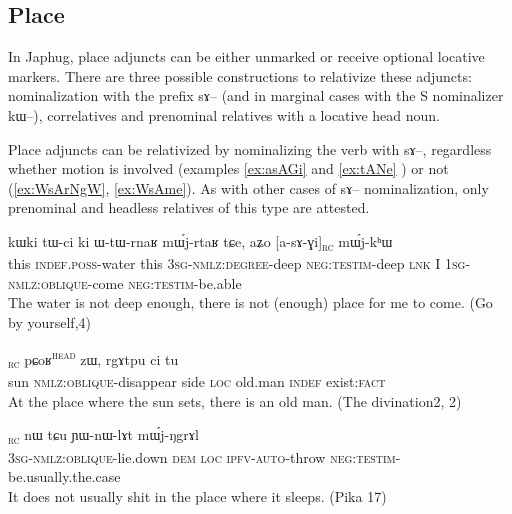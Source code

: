 \documentclass[oldfontcommands,oneside,a4paper,11pt]{article}
\newcommand{\ipa}[1]{{\phon #1}} %
\newcommand{\tete}{\textsuperscript{\textsc{head}}}
\newcommand{\rc}{\textsubscript{\textsc{rc}}}
\begin{document}
 



\subsection{Place} \label{sec:rel:place}
In Japhug, place adjuncts can be either unmarked or receive optional locative markers. %
There are three possible constructions to relativize these adjuncts: nominalization with the prefix \ipa{sɤ}-- (and in marginal cases with the S nominalizer \ipa{kɯ--}), correlatives and prenominal relatives with a locative head noun.

Place adjuncts can be relativized by nominalizing the verb with \ipa{sɤ}--, regardless whether motion is involved (examples \ref{ex:asAGi} and \ref{ex:tANe} )  or not (\ref{ex:WsArNgW}, \ref{ex:WsAme}). As with other cases of \ipa{sɤ}-- nominalization, only prenominal and headless relatives of this type are attested.

\begin{exe}
   \ex \label{ex:asAGi}
 \gll
\ipa{kɯki}   	\ipa{tɯ-ci}   	\ipa{ki}   	\ipa{ɯ-tɯ-rnaʁ}   	\ipa{mɯ́j-rtaʁ}   	\ipa{tɕe,}   	\ipa{aʑo}   	[\ipa{a-sɤ-ɣi}]\rc{}   	\ipa{mɯ́j-kʰɯ}   \\
this \textsc{indef.poss}-water this \textsc{3sg-nmlz:degree}-deep \textsc{neg:testim}-deep \textsc{lnk} I \textsc{1sg-nmlz:oblique}-come \textsc{neg:testim}-be.able \\
\glt The water is not deep enough, there is not (enough) place for me to come. (Go by yourself,4)
\end{exe}


\begin{exe}
   \ex \label{ex:tANe}
 \gll [\ipa{tɤŋe}   	\ipa{sɤ-ɕqʰlɤt}]\rc{}   	\ipa{pɕoʁ}\tete{}   	\ipa{zɯ,}   	\ipa{rgɤtpu}   	\ipa{ci}   	\ipa{tu}   \\
sun \textsc{nmlz:oblique}-disappear side \textsc{loc} old.man \textsc{indef} exist:\textsc{fact} \\
\glt At the place where the sun sets, there is an old man. (The divination2, 2)
\end{exe}
\begin{exe}
   \ex \label{ex:WsArNgW}
 \gll
[\ipa{ɯ-sɤ-rŋgɯ}]\rc{}   	\ipa{nɯ} \ipa{tɕu}   	\ipa{ɲɯ-nɯ-lɤt}   	\ipa{mɯ́j-ŋgrɤl}   \\
\textsc{3sg-nmlz:oblique}-lie.down \textsc{dem} \textsc{loc} \textsc{ipfv-auto}-throw \textsc{neg:testim}-be.usually.the.case \\
\glt  It  does not usually shit in the place where it sleeps. (Pika 17)
\end{exe}
\end{document}
